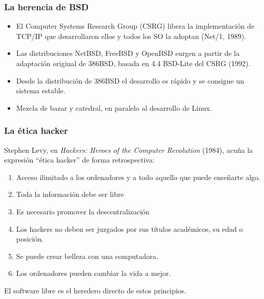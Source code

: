 \documentclass{beamer}
\begin{document}

\begin{frame}
\frametitle{La herencia de BSD}

\begin{itemize}
\item El Computer Systems Research Group (CSRG) libera la implementación de TCP/IP que desarrollaron ellos y todos los SO la adoptan (Net/1, 1989). 
\item Las distribuciones NetBSD, FreeBSD y OpenBSD surgen a partir de la adaptación original de 386BSD, basada en 4.4 BSD-Lite del CSRG (1992).
\item Desde la distribución de 386BSD el desarrollo es rápido y se consigue un sistema estable.
\item Mezcla de bazar y catedral, en paralelo al desarrollo de Linux.
\end{itemize}

\end{frame}


\begin{frame}
\frametitle{La ética hacker}

Stephen Levy, en \textit{Hackers: Heroes of the Computer Revolution} (1984), acuña la expresión ``ética hacker'' de forma retrospectiva:

\begin{enumerate}
\item Acceso ilimitado a los ordenadores y a todo aquello que puede enseñarte algo.
\item Toda la información debe ser libre
\item Es necesario promover la descentralización
\item Los hackers no deben ser juzgados por sus títulos académicos, su edad o posición.
\item Se puede crear belleza con una computadora.
\item Los ordenadores pueden cambiar la vida a mejor.
\end{enumerate}

\pause

\begin{center}
\alert{El software libre es el heredero directo de estos principios.}
\end{center}

\end{frame}
\end{document}
